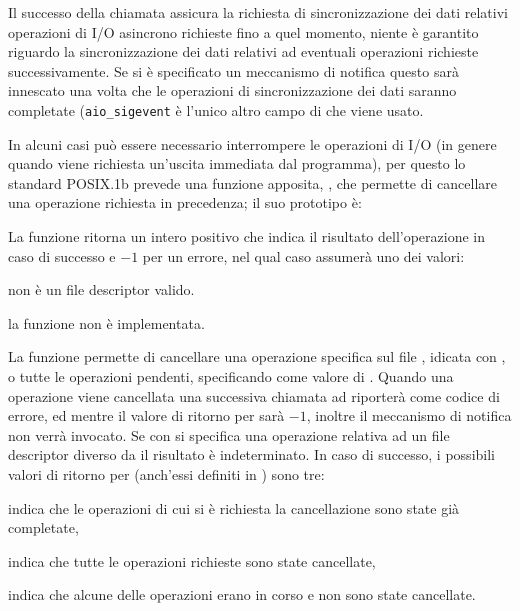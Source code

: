 Il successo della chiamata assicura la richiesta di sincronizzazione dei dati
relativi operazioni di I/O asincrono richieste fino a quel momento, niente è
garantito riguardo la sincronizzazione dei dati relativi ad eventuali
operazioni richieste successivamente. Se si è specificato un meccanismo di
notifica questo sarà innescato una volta che le operazioni di sincronizzazione
dei dati saranno completate (\texttt{aio\_sigevent} è l'unico altro campo
di  che viene usato.

In alcuni casi può essere necessario interrompere le operazioni di I/O (in
genere quando viene richiesta un'uscita immediata dal programma), per questo
lo standard POSIX.1b prevede una funzione apposita, , che
permette di cancellare una operazione richiesta in precedenza; il suo
prototipo è:

\begin{funcproto}{
}

{La funzione ritorna un intero positivo che indica il risultato
  dell'operazione in caso di successo e $-1$ per un errore, nel qual caso
   assumerà uno dei valori:
  \begin{errlist}
  \item[\errcode{EBADF}]  non è un file descriptor valido.
  \item[\errcode{ENOSYS}] la funzione non è implementata.
  \end{errlist}
}
\end{funcproto}

La funzione permette di cancellare una operazione specifica sul file
, idicata con , o tutte le operazioni pendenti,
specificando  come valore di . Quando una operazione
viene cancellata una successiva chiamata ad  riporterà
 come codice di errore, ed mentre il valore di ritorno per
 sarà $-1$, inoltre il meccanismo di notifica non verrà
invocato. Se con  si specifica una operazione relativa ad un
file descriptor diverso da  il risultato è indeterminato.  In caso
di successo, i possibili valori di ritorno per  (anch'essi
definiti in ) sono tre:
\begin{basedescript}{\desclabelwidth{3.0cm}}
\item[\constd{AIO\_ALLDONE}] indica che le operazioni di cui si è richiesta la
  cancellazione sono state già completate,
  
\item[\constd{AIO\_CANCELED}] indica che tutte le operazioni richieste sono
  state cancellate,  
  
\item[\constd{AIO\_NOTCANCELED}] indica che alcune delle operazioni erano in
  corso e non sono state cancellate.
\end{basedescript}


